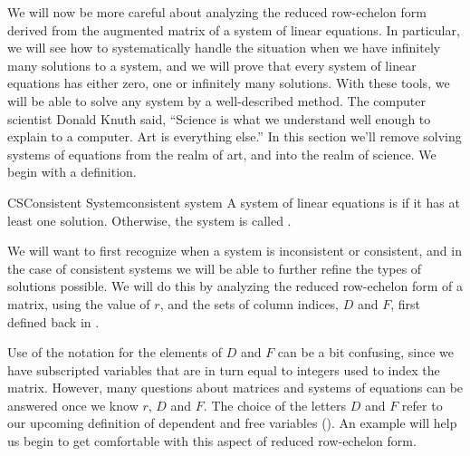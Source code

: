 %
We will now be more careful about analyzing the reduced row-echelon form derived from the  augmented matrix of a system of linear equations.    In particular, we will see how to systematically handle the situation when we have infinitely many solutions to a system, and we will prove that every system of linear equations has either zero, one or infinitely many solutions.  With these tools, we will be able to solve any system by a well-described method.
%
%
The computer scientist Donald Knuth said, ``Science is what we understand well enough to explain to a computer. Art is everything else.''  In this section we'll remove solving systems of equations from the realm of art, and into the realm of science.  We begin with a definition.
%
\begin{definition}{CS}{Consistent System}{consistent system}
A system of linear equations is  if it has at least one solution.  Otherwise, the system is called .
\end{definition}
%
We will want to first recognize when a system is inconsistent or consistent, and in the case of consistent systems we will be able to further refine the types of solutions possible.  We will do this by analyzing the reduced row-echelon form of a matrix, using the value of $r$, and the sets of column indices, $D$ and $F$, first defined back in .\par
%
Use of the notation for the elements of $D$ and $F$ can be a bit confusing, since we have subscripted variables that are in turn equal to integers used to index the matrix.  However, many questions about matrices and systems of equations can be answered once we know $r$, $D$ and $F$.  The choice of the letters $D$ and $F$ refer to our upcoming definition of dependent and free variables ().  An example will help us begin to get comfortable with this aspect of reduced row-echelon form.
%

